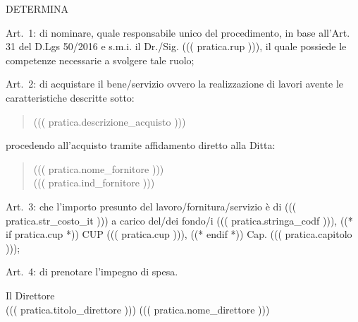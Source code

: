 \documentclass[a4paper,12pt]{letter}
\begin{document}
\begin{center}
DETERMINA
\end{center}

\begin{list}{VALUTATA}{}
\item[Art.~1:] di nominare, quale responsabile unico del procedimento, in base 
           all'Art. 31 del D.Lgs 50/2016 e s.m.i. il Dr./Sig. ((( pratica.rup ))),
           il quale possiede le competenze necessarie a svolgere tale ruolo; 
\item[Art.~2:] di acquistare il bene/servizio ovvero la realizzazione di lavori
        avente le caratteristiche descritte sotto:
\begin{quote}
            ((( pratica.descrizione_acquisto )))
\end{quote}

procedendo all'acquisto tramite affidamento diretto alla Ditta: 

\begin{quote}
((( pratica.nome_fornitore )))\\
((( pratica.ind_fornitore )))
\end{quote}


\item[Art.~3:] che l'importo presunto del lavoro/fornitura/servizio \`e di 
((( pratica.str_costo_it )))
a carico del/dei fondo/i ((( pratica.stringa_codf ))), ((* if pratica.cup *)) CUP ((( pratica.cup ))), ((* endif *)) Cap. ((( pratica.capitolo ))); 

\item[Art.~4:] di prenotare l'impegno di spesa. 
\end{list}

\vspace{0.5cm}

\begin{flushright}
\begin{minipage}[t]{6cm}
\begin{center}
Il Direttore \\
((( pratica.titolo_direttore ))) ((( pratica.nome_direttore )))
\end{center}
\end{minipage}
\end{flushright}
\end{document}
